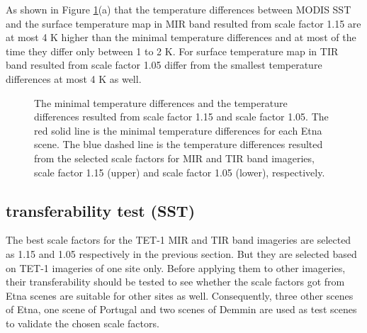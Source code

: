 \noindent As shown in Figure \ref{fig:etna_bsc&temComp}(a) that the temperature differences between MODIS SST and the surface temperature map in MIR band resulted from scale factor 1.15 are at most 4 K higher than the minimal temperature differences and at most of the time they differ only between 1 to 2 K. For surface temperature map in TIR band resulted from scale factor 1.05 differ from the smallest temperature differences at most 4 K as well.\\

\begin{figure}[!htbp]
\centering
{}
\hspace{0.5in}
\caption{The minimal temperature differences and the temperature differences resulted from scale factor 1.15 and scale factor 1.05. The red solid line is the minimal temperature differences for each Etna scene. The blue dashed line is the temperature differences resulted from the selected scale factors for MIR and TIR band imageries, scale factor 1.15 (upper) and scale factor 1.05 (lower), respectively.}
\label{fig:etna_bsc&temComp}
\end{figure}



\subsection{transferability test (SST)}
The best scale factors for the TET-1 MIR and TIR band imageries are selected as 1.15 and 1.05 respectively in the previous section. But they are selected based on TET-1 imageries of one site only. Before applying them to other imageries, their transferability should be tested to see whether the scale factors got from Etna scenes are suitable for other sites as well. Consequently, three other scenes of Etna, one scene of Portugal and two scenes of Demmin are used as test scenes to validate the chosen scale factors.\\

